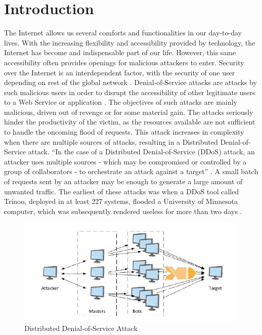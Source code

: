 \section{Introduction}
The Internet allows us several comforts and functionalities in our day-to-day lives. With the increasing flexibility and accessibility provided by technology, the Internet has become and indispensable part of our life. However, this same accessibility often provides openings for malicious attackers to enter. Security over the Internet is an interdependent factor, with the security of one user depending on rest of the global network \cite{monowar01}. Denial-of-Service attacks are attacks by such malicious users in order to disrupt the accessibility of other legitimate users to a Web Service or application \cite{amazon02}. The objectives of such attacks are mainly malicious, driven out of revenge or for some material gain. The attacks seriously hinder the productivity of the victim, as the resources available are not sufficient to handle the oncoming flood of requests. This attack increases in complexity when there are multiple sources of attacks, resulting in a Distributed Denial-of-Service attack. ``In the case of a Distributed Denial-of-Service (DDoS) attack, an attacker uses multiple sources - which may be compromised or controlled by a group of collaborators - to orchestrate an attack against a target'' \cite{amazon02}. A small batch of requests sent by an attacker may be enough to generate a large amount of unwanted traffic. The earliest of these attacks was when a DDoS tool called Trinoo, deployed in at least 227 systems, flooded a University of Minnesota computer, which was subsequently rendered useless for more than two days \cite{monowar01}.
\begin{figure}
	\includegraphics[width=1.0\columnwidth]{images/DDoS.PNG}
	\caption{Distributed Denial-of-Service Attack \cite{amazon02}}
	\label{F:ddos}
\end{figure}
